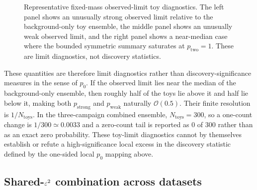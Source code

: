 \begin{figure}[H]
\centering
{}
\caption{Representative fixed-mass observed-limit toy diagnostics. The left panel
shows an unusually strong observed limit relative to the background-only toy
ensemble, the middle panel shows an unusually weak observed limit, and the right
panel shows a near-median case where the bounded symmetric summary saturates at
$p_{\mathrm{two}}=1$. These are limit diagnostics, not discovery
statistics.}
\label{fig:pvalue-tail-examples}
\end{figure}

These quantities are therefore limit diagnostics rather than discovery-significance
measures in the sense of $p_0$. If the observed limit lies near the median of the
background-only ensemble, then roughly half of the toys lie above it and half lie
below it, making both $p_{\mathrm{strong}}$ and $p_{\mathrm{weak}}$ naturally
$\mathcal{O}(0.5)$. Their finite resolution is $1/N_{\mathrm{toys}}$. In the
three-campaign combined ensemble, $N_{\mathrm{toys}}=300$, so a one-count change is
$1/300\simeq0.0033$ and a zero-count tail is reported as 0 of 300 rather than as an
exact zero probability. These toy-limit diagnostics cannot by themselves establish
or refute a high-significance local excess in the discovery statistic defined by the
one-sided local $p_0$ mapping above.

\subsection{Shared-\texorpdfstring{$\varepsilon^2$}{epsilon2} combination across datasets}
\label{sec:combination}

